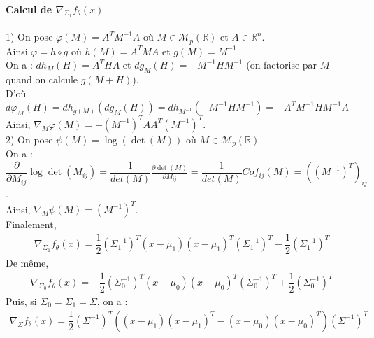 \documentclass[paper=a4, fontsize=11pt]{article}
\begin{document}
\paragraph{Calcul de $\nabla_{\Sigma_1}f_{\theta}(x)$\\}
1) On pose $\varphi(M) = A^{T}M^{-1}A$ où $M \in \mathcal{M}_{p}(\mathbb{R})$ et $A \in \mathbb{R}^{n}$. \\
Ainsi $\varphi = h \circ g$ où $h(M) = A^{T}MA$ et $g(M) = M^{-1}$.\\
On a : $dh_{M}(H) = A^{T}HA$ et $dg_{M}(H) = -M^{-1}HM^{-1}$ (on factorise par $M$ quand on calcule $g(M+H)$).\\
D'où $d\varphi_{M}(H) = dh_{g(M)}(dg_{M}(H)) = dh_{M^{-1}}(-M^{-1}HM^{-1}) 
= - A^{T}M^{-1}HM^{-1}A $\\
Ainsi, $\nabla_{M}\varphi(M) = -(M^{-1})^{T}AA^{T}(M^{-1})^{T}$.\\


2) On pose $\psi(M) = \log(\det(M))$ où $M \in \mathcal{M}_{p}(\mathbb{R})$\\
On a : $\dfrac{\partial}{\partial M_{ij}}\log\det(M_{ij}) = \dfrac{1}{det(M)}\frac{\partial \det(M)}{\partial M_{ij}}= \dfrac{1}{det(M)} Cof_{ij}(M) = ((M^{-1})^{T})_{ij}$.\\
Ainsi, $\nabla_{M}\psi(M) = (M^{-1})^{T}$.\\


Finalement, 
\begin{align*}
\nabla_{\Sigma_1}f_{\theta}(x) = \dfrac{1}{2}(\Sigma_1^{-1})^{T}(x-\mu_1)(x-\mu_1)^{T}(\Sigma_1^{-1})^{T} - \dfrac{1}{2}(\Sigma_1^{-1})^{T}
\end{align*}
De même, 
\begin{align*}
\nabla_{\Sigma_0}f_{\theta}(x) = -\dfrac{1}{2}(\Sigma_0^{-1})^{T}(x-\mu_0)(x-\mu_0)^{T}(\Sigma_0^{-1})^{T} + \dfrac{1}{2}(\Sigma_0^{-1})^{T}
\end{align*}
Puis, si $\Sigma_0 = \Sigma_1 = \Sigma$, on a : 
\begin{align*}
\nabla_{\Sigma}f_{\theta}(x) = \dfrac{1}{2}(\Sigma^{-1})^{T}((x-\mu_1)(x-\mu_1)^{T}-(x-\mu_0)(x-\mu_0)^{T})(\Sigma^{-1})^{T}
\end{align*}
\end{document}
